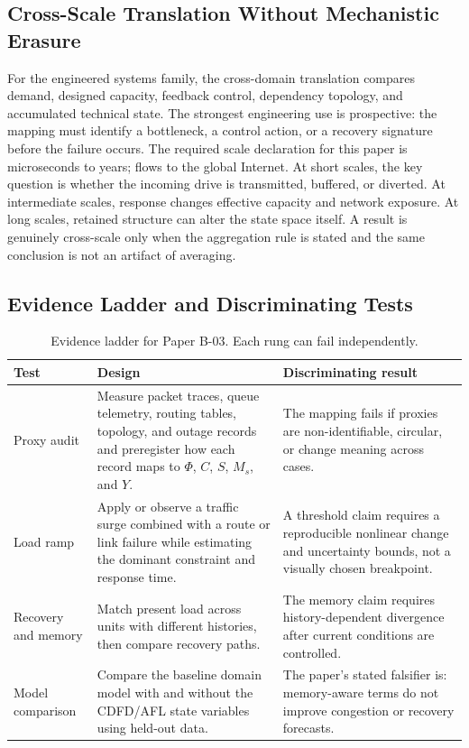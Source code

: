 \documentclass[11pt,a4paper]{article}
\begin{document}
\subsection{Cross-Scale Translation Without Mechanistic Erasure}

For the engineered systems family, the cross-domain translation compares demand, designed capacity, feedback control, dependency topology, and accumulated technical state. The strongest engineering use is prospective: the mapping must identify a bottleneck, a control action, or a recovery signature before the failure occurs. \cite{BarabasiAlbert1999,WattsStrogatz1998,Shannon1948,BakTangWiesenfeld1987}
The required scale declaration for this paper is microseconds to years; flows to the global Internet. At short
scales, the key question is whether the incoming drive is transmitted,
buffered, or diverted. At intermediate scales, response changes effective
capacity and network exposure. At long scales, retained structure can alter the
state space itself. A result is genuinely cross-scale only when the aggregation
rule is stated and the same conclusion is not an artifact of averaging.

\subsection{Evidence Ladder and Discriminating Tests}

\begin{table}[htbp]
\centering
\small
\caption{Evidence ladder for Paper B-03. Each rung can fail independently.}
\begin{tabularx}{\textwidth}{|p{}|X|X|}
\hline
\textbf{Test} & \textbf{Design} & \textbf{Discriminating result} \\
\hline
Proxy audit & Measure packet traces, queue telemetry, routing tables, topology, and outage records and preregister how each record maps to $\Phi$, $C$, $S$, $M_s$, and $Y$. & The mapping fails if proxies are non-identifiable, circular, or change meaning across cases. \\
\hline
Load ramp & Apply or observe a traffic surge combined with a route or link failure while estimating the dominant constraint and response time. & A threshold claim requires a reproducible nonlinear change and uncertainty bounds, not a visually chosen breakpoint. \\
\hline
Recovery and memory & Match present load across units with different histories, then compare recovery paths. & The memory claim requires history-dependent divergence after current conditions are controlled. \\
\hline
Model comparison & Compare the baseline domain model with and without the CDFD/AFL state variables using held-out data. & The paper's stated falsifier is: memory-aware terms do not improve congestion or recovery forecasts. \\
\hline
\end{tabularx}
\end{table}
\end{document}
